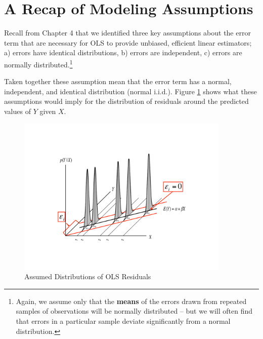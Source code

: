 \documentclass[11pt,openany]{book}\usepackage[]{graphicx}\usepackage[]{color}
\begin{document}
\section{A Recap of Modeling Assumptions}

Recall from Chapter 4 that we identified three key assumptions about the error term that are necessary for OLS to provide unbiased, efficient linear estimators; a) errors have identical distributions, b) errors are independent, c) errors are normally distributed.\footnote{Again, we assume only that the \textbf{means} of the errors drawn from repeated samples of observations will be normally distributed -- but we will often find that errors in a particular sample deviate significantly from a normal distribution.}

\begin{grbox}
\end{grbox}

Taken together these assumption mean that the error term has a normal, independent, and identical distribution (normal i.i.d.). Figure \ref{fig:residdist} shows what these assumptions would imply for the distribution of residuals around the predicted values of $Y$ given $X$.


\begin{figure}
  \centering
  \includegraphics[width=4in]{10_SimpleDiagnostics/residdist.pdf}%
  \caption{Assumed Distributions of OLS Residuals \label{fig:residdist}}
\end{figure}
\end{document}
